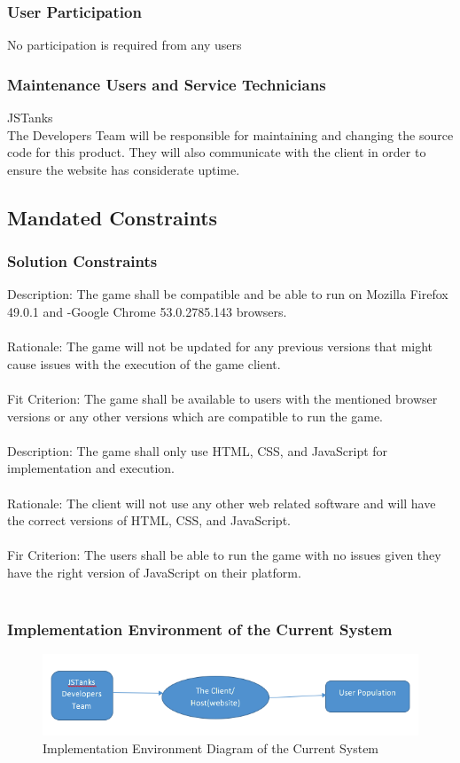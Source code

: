 \documentclass[12pt, titlepage]{article}
\begin{document}
\subsubsection{User Participation}
No participation is required from any users
\subsubsection{Maintenance Users and Service Technicians}
JSTanks\\
The Developers Team will be responsible for maintaining and changing the source
code for this product. They will also communicate with the client in order to
ensure the website has considerate uptime.
\subsection{Mandated Constraints}
\subsubsection{Solution Constraints}
 Description: The game shall be compatible
and be able to run on Mozilla Firefox 49.0.1 and -Google Chrome 53.0.2785.143
browsers.\\\\ Rationale: The game will not be updated for any previous versions
that might cause issues with the execution of the game client.\\\\ Fit
Criterion: The game shall be available to users with the mentioned browser
versions or any other versions which are compatible to run the game.\\\\
Description: The game shall only use HTML, CSS, and JavaScript for
implementation and execution.\\\\ Rationale: The client will not use any other
web related software and will have the correct versions of HTML, CSS, and
JavaScript. \\\\ Fir Criterion: The users shall be able to run the game with no
issues given they have the right version of JavaScript on their platform. \\\\
\subsubsection{Implementation Environment of the Current System}
\begin{figure}[hb]
\includegraphics[width=\textwidth]{Fig1.png}
\caption{Implementation Environment  Diagram of the Current System} \label{fig:Fig1.png}
\end{figure}
\end{document}
